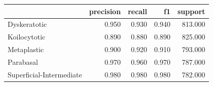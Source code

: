 \begin{tabular}{lrrrr}
\toprule
 & precision & recall & f1 & support \\
\midrule
Dyskeratotic & 0.950 & 0.930 & 0.940 & 813.000 \\
Koilocytotic & 0.890 & 0.880 & 0.890 & 825.000 \\
Metaplastic & 0.900 & 0.920 & 0.910 & 793.000 \\
Parabasal & 0.970 & 0.960 & 0.970 & 787.000 \\
Superficial-Intermediate & 0.980 & 0.980 & 0.980 & 782.000 \\
\bottomrule
\end{tabular}
